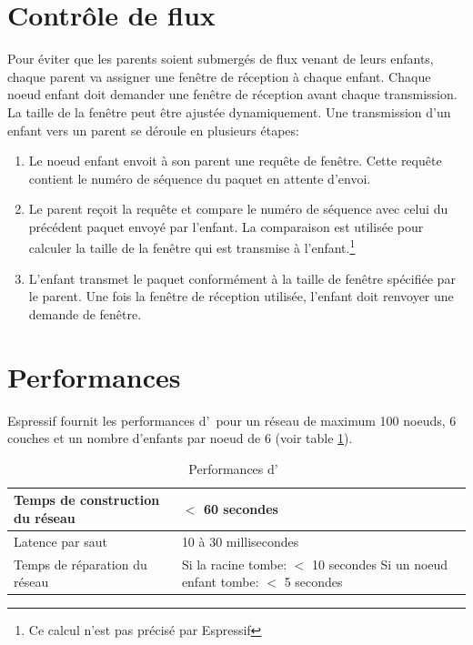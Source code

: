         \section{Contrôle de flux}
        \label{compute_windowSize}
            Pour éviter que les parents soient submergés de flux venant de leurs enfants, chaque parent va
            assigner une fenêtre de réception à chaque enfant. Chaque noeud enfant doit demander une fenêtre
            de réception avant chaque transmission. La taille de la fenêtre peut être ajustée dynamiquement.
            Une transmission d'un enfant vers un parent se déroule en plusieurs étapes:
            \begin{enumerate}
                \item Le noeud enfant envoit à son parent une requête de fenêtre. Cette requête contient le numéro de séquence du paquet en attente d'envoi.
                \item Le parent reçoit la requête et compare le numéro de séquence avec celui du précédent paquet envoyé par l'enfant.
                    La comparaison est utilisée pour calculer la taille de la fenêtre qui est transmise à l'enfant.\footnote{Ce calcul n'est pas précisé par Espressif}
                \item L'enfant transmet le paquet conformément à la taille de fenêtre spécifiée par le parent. Une fois la fenêtre de réception utilisée, l'enfant doit renvoyer une demande de fenêtre.
            \end{enumerate}
        \section{Performances}
            Espressif fournit les performances d'\espmesh\ pour un réseau de maximum 100 noeuds, 6 couches et
            un nombre d'enfants par noeud de 6 (voir table \ref{performances_espMesh}).
            \begin{table}[H]
                \begin{tabular}{|l|l|}
                    \hline
                    Temps de construction du réseau & $<$ 60 secondes\\ \hline
                    Latence par saut & 10 à 30 millisecondes\\ \hline
                    Temps de réparation du réseau & \makecell{Si la racine tombe: $<$ 10 secondes \\ Si un noeud enfant tombe: $<$ 5 secondes}\\ \hline
                \end{tabular}
                \caption{Performances d'\espmesh\ \cite{esp-mesh}}
                \label{performances_espMesh}
            \end{table}
